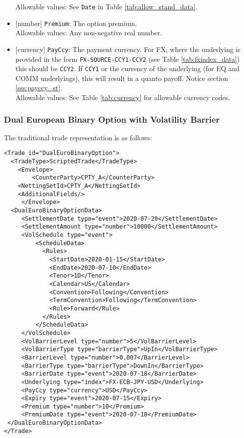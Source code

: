 \begin{itemize}
  Allowable values: See \lstinline!Date! in Table \ref{tab:allow_stand_data}.
  \item{}[number] \lstinline!Premium!: The option premium. \\
  Allowable values: Any non-negative real number.
  \item{}[currency] \lstinline!PayCcy!: The payment currency. For FX, where the underlying is provided
      in the form \lstinline!FX-SOURCE-CCY1-CCY2! (see Table \ref{tab:fxindex_data}) this should
      be \lstinline!CCY2!. If \lstinline!CCY1! or the currency of the underlying (for EQ and
      COMM underlyings), this will result in a quanto payoff. Notice section \ref{sss:payccy_st}. \\
        Allowable values: See Table \ref{tab:currency} for allowable currency codes.
\end{itemize}

\subsubsection*{Dual European Binary Option with Volatility Barrier}

The traditional trade representation is as follows:

\begin{verbatim}
<Trade id="DualEuroBinaryOption">
  <TradeType>ScriptedTrade</TradeType>
    <Envelope>
        <CounterParty>CPTY_A</CounterParty>
  	<NettingSetId>CPTY_A</NettingSetId>
  	<AdditionalFields/>
     </Envelope>
  <DualEuroBinaryOptionData>
     <SettlementDate type="event">2020-07-20</SettlementDate>
     <SettlementAmount type="number">10000</SettlementAmount>
     <VolSchedule type="event">
         <ScheduleData>
           <Rules>
             <StartDate>2020-01-15</StartDate>
             <EndDate>2020-07-10</EndDate>
             <Tenor>1D</Tenor>
             <Calendar>US</Calendar>
             <Convention>Following</Convention>
             <TermConvention>Following</TermConvention>
             <Rule>Forward</Rule>
           </Rules>
         </ScheduleData>
     </VolSchedule>
     <VolBarrierLevel type="number">5</VolBarrierLevel>
     <VolBarrierType type="barrierType">UpIn</VolBarrierType>
     <BarrierLevel type="number">0.007</BarrierLevel>
     <BarrierType type="barrierType">DownIn</BarrierType>         
     <BarrierDate type="event">2020-07-18</BarrierDate>
     <Underlying type="index">FX-ECB-JPY-USD</Underlying>
     <PayCcy type="currency">USD</PayCcy>
     <Expiry type="event">2020-07-15</Expiry>
     <Premium type="number">10</Premium>        
     <PremiumDate type="event">2020-07-18</PremiumDate>
 </DualEuroBinaryOptionData>
</Trade>
\end{verbatim}

